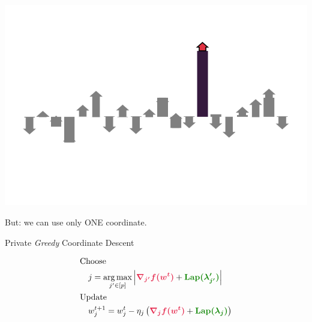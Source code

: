 \documentclass{beamer}
\begin{document}
\begin{frame}
  \vspace{1em}

  \includegraphics[width=\textwidth]{grad_example_3.pdf}

  \vspace{-3em}

  \begin{center}
    \Huge But: we can use only \textsc{ONE} coordinate.
  \end{center}
  \addtocounter{framenumber}{-1}
\end{frame}



\begin{frame}
  \vspace{2em}

  \begin{center}
    {\huge Private \emph{Greedy} Coordinate Descent}
  \end{center}
  \begin{align*}
    & \text{Choose} \\
    & \quad j = \argmax_{j'\in[p]} \abs{\emphcol{\nabla_{j'} f(w^t)} + \emphcolb{\Lap(\lambda_{j'}')}} \\
    & \text{Update} \\
    & \quad w^{t+1}_{j} =
      w^t_{j} - \eta_{j}
    \left( \emphcol{\nabla_{j} f(w^t)}
    + \emphcolb{\Lap(\lambda_{j})} \right)
  \end{align*}
\end{frame}
\end{document}
